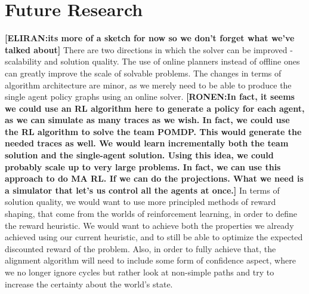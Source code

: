 \documentclass[letterpaper]{article} %
\theoremstyle{definition}
\newcommand{\eliran}[1]{\textbf{[\color{red}ELIRAN:#1]}}
\newcommand{\ronen}[1]{\textbf{[\color{blue}RONEN:#1]}}
\begin{document}
\section{Future Research}
\eliran{its more of a sketch for now so we don't forget what we've talked about}
There are two directions in which the solver can be improved -  scalability and solution quality.
The use of online planners instead of offline ones can greatly improve the scale of solvable problems. The changes in terms of algorithm architecture are minor, as we merely need to be able to produce the single agent policy graphs using an online solver. \ronen{In fact, it seems we could use an RL algorithm here to generate a policy for each agent, as we can simulate as many traces as we wish.
In fact, we could use the RL algorithm to solve the team POMDP. This would generate the needed traces as well. We would learn incrementally
both the team solution and the single-agent solution. Using this idea, we could probably scale up to very large problems. In fact, we can use this
approach to do MA RL. If we can do the projections. What we need is a simulator that let's us control all the agents at once.}
In terms of solution quality, we would want to use more principled methods of reward shaping, that come from the worlds of reinforcement learning, in order to define the reward heuristic. We would want to achieve both the properties we already achieved using our current heuristic, and to still be able to optimize the expected discounted reward of the problem.
Also, in order to fully achieve that, the alignment algorithm will need to include some form of confidence aspect, where we no longer ignore cycles but rather look at non-simple paths and try to increase the certainty about the world's state. 



\end{document}
